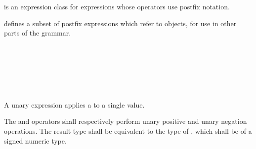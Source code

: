 \begin{grammar}
 \\
	 \\
	 \\
	 \\
	 \\
	 \\
	 \\
	 \\

 \\
	 \\
	 \\
	 \\
\end{grammar}

\specsubsubitem
{} is an expression class for expressions whose
operators use postfix notation.

\specsubsubitem
{} defines a subset of postfix expressions which
refer to objects, for use in other parts of the grammar.


\begin{grammar}
 \\
	 \\
	  \\
	\terminal{\&}  \\

 \oneof \\
	\terminal{+}
	\terminal{-}
	\terminal{\textasciitilde}
	\terminal{!}
	\terminal{*}
\end{grammar}

\specsubsubitem
A unary expression applies a  to a single value.

\specsubsubitem
The \terminal{+} and \terminal{-} operators shall respectively perform unary
positive and unary negation operations. The result type shall be equivalent to
the type of , which shall be of a signed numeric
type.

